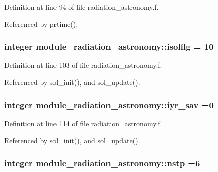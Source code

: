 Definition at line 94 of file radiation\+\_\+astronomy.\+f.



Referenced by prtime().

\subsubsection[{\texorpdfstring{isolflg}{isolflg}}]{\setlength{\rightskip}{0pt plus 5cm}integer module\+\_\+radiation\+\_\+astronomy\+::isolflg = 10\hspace{0.3cm}{\ttfamily [private]}}\hypertarget{namespacemodule__radiation__astronomy_a7ea431b6d4f4d6ee1f6545d6baeee44f}{}\label{namespacemodule__radiation__astronomy_a7ea431b6d4f4d6ee1f6545d6baeee44f}


Definition at line 103 of file radiation\+\_\+astronomy.\+f.



Referenced by sol\+\_\+init(), and sol\+\_\+update().

\subsubsection[{\texorpdfstring{iyr\+\_\+sav}{iyr_sav}}]{\setlength{\rightskip}{0pt plus 5cm}integer module\+\_\+radiation\+\_\+astronomy\+::iyr\+\_\+sav =0\hspace{0.3cm}{\ttfamily [private]}}\hypertarget{namespacemodule__radiation__astronomy_a83370fbee96388e545a89eb25ed6df90}{}\label{namespacemodule__radiation__astronomy_a83370fbee96388e545a89eb25ed6df90}


Definition at line 114 of file radiation\+\_\+astronomy.\+f.



Referenced by sol\+\_\+init(), and sol\+\_\+update().

\subsubsection[{\texorpdfstring{nstp}{nstp}}]{\setlength{\rightskip}{0pt plus 5cm}integer module\+\_\+radiation\+\_\+astronomy\+::nstp =6\hspace{0.3cm}{\ttfamily [private]}}\hypertarget{namespacemodule__radiation__astronomy_ab93fe36440da3cc1f1d64cae2ec4c25b}{}\label{namespacemodule__radiation__astronomy_ab93fe36440da3cc1f1d64cae2ec4c25b}



